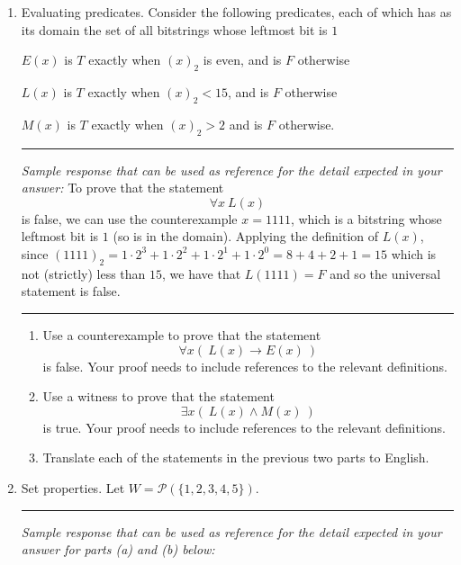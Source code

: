 \begin{enumerate}[labelindent=0pt, leftmargin=0pt]
    \vfill
    \newpage 
    \item  Evaluating predicates. Consider the following predicates, each of which has 
    as its domain the set of all bitstrings whose leftmost bit is $1$
    
    $E(x)$ is $T$ exactly when $(x)_{2}$ is even, and is $F$ otherwise
    
    $L(x)$ is $T$ exactly when $(x)_2 < 15$, and is $F$ otherwise
    
    $M(x)$ is $T$ exactly when $(x)_2 > 2$ and is $F$ otherwise.
    
    
    \rule{0.5\textwidth}{.4pt}
    
    {\it Sample response that can be used as reference for the detail expected 
    in your answer:} To prove that the statement $$\forall x ~L(x)$$ is false, we can use 
    the counterexample $x = 1111$, which is a bitstring whose leftmost bit is $1$ (so is in the domain).
    Applying the definition of $L(x)$, since $(1111)_2 = 1 \cdot 2^3 + 1\cdot 2^2 + 1 \cdot 2^1 + 1 \cdot 2^0 = 8 + 4+2+1 = 15$
    which is not (strictly) less than $15$, we have that $L(1111) = F$ and so the universal statement is false.
    
    
    \rule{0.5\textwidth}{.4pt}
    

    \begin{enumerate}
    \item Use a counterexample to prove that the statement
    \[
    \forall x ( ~L(x) \to E(x)~)
    \]
    is false.   Your proof needs to include references to the relevant definitions.

    
    \item Use a witness to prove that the statement
    \[
    \exists x (~L(x) \land M(x) ~)
    \]
    is true.  Your proof needs to include references to the relevant definitions.

    
    \item Translate each of the statements in the previous two
    parts to English.
    \end{enumerate}

        
    \vfill
    \newpage 
    \item Set properties. Let $W = \mathcal{P}(\{1,2,3,4,5\})$. 


    \rule{0.5\textwidth}{.4pt}
    
    {\it Sample response that can be used as reference for the detail expected 
    in your answer for parts (a) and (b) below:} 
    

\end{enumerate}
